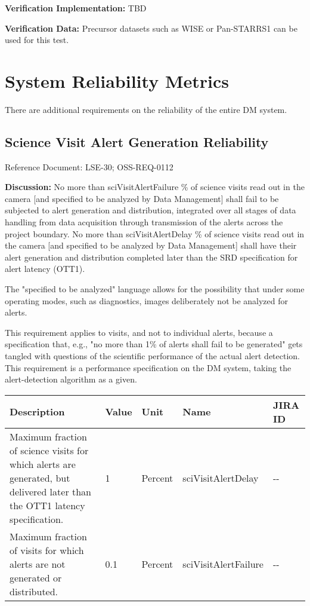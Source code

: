 \documentclass[DM,lsstdraft,toc]{lsstdoc}
\begin{document}
\textbf{Verification Implementation:} TBD

\textbf{Verification Data:} Precursor datasets such as WISE or
Pan-STARRS1 can be used for this test.

\section{System Reliability Metrics}\label{system-reliability-metrics}

There are additional requirements on the reliability of the entire DM
system.

\subsection{Science Visit Alert Generation
Reliability}\label{science-visit-alert-generation-reliability}

Reference Document: LSE-30; OSS-REQ-0112

\textbf{Discussion:} No more than sciVisitAlertFailure \% of science
visits read out in the camera {[}and specified to be analyzed by Data
Management{]} shall fail to be subjected to alert generation and
distribution, integrated over all stages of data handling from data
acquisition through transmission of the alerts across the project
boundary. No more than sciVisitAlertDelay \% of science visits read out
in the camera {[}and specified to be analyzed by Data Management{]}
shall have their alert generation and distribution completed later than
the SRD specification for alert latency (OTT1).

The "specified to be analyzed" language allows for the possibility that
under some operating modes, such as diagnostics, images deliberately not
be analyzed for alerts.

This requirement applies to visits, and not to individual alerts,
because a specification that, e.g., "no more than 1\% of alerts shall
fail to be generated" gets tangled with questions of the scientific
performance of the actual alert detection. This requirement is a
performance specification on the DM system, taking the alert-detection
algorithm as a given.

\begin{longtable}[]{@{}p{}llll@{}}
\toprule
Description & Value & Unit & Name & JIRA ID\tabularnewline
\midrule
\endhead
Maximum fraction of science visits for which alerts are generated, but
delivered later than the OTT1 latency specification. & 1 & Percent &
sciVisitAlertDelay & -\/-\tabularnewline
Maximum fraction of visits for which alerts are not generated or
distributed. & 0.1 & Percent & sciVisitAlertFailure &
-\/-\tabularnewline
\bottomrule
\end{longtable}
\end{document}
